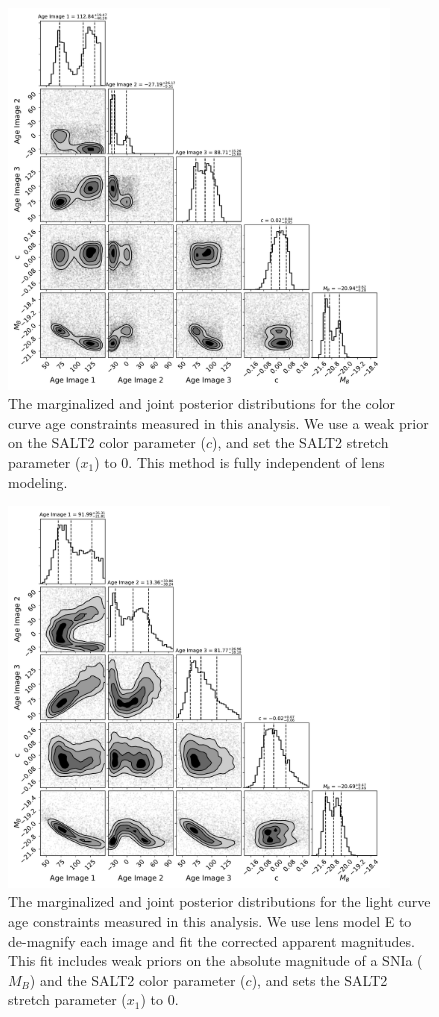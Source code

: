 \documentclass[12pt,dvipsnames]{article}
\begin{document}
\begin{figure}
    \centering
    \includegraphics[width=0.9\textwidth]{Paper/Figures/lc_modelH_color_corner.pdf}
    \caption{The marginalized and joint posterior distributions for the color curve age constraints measured in this analysis. We use a weak prior on the SALT2 color parameter ($c$), and set the SALT2 stretch parameter ($x_1$) to 0. This method is fully independent of lens modeling. }
    \label{fig:corner_cfit}
\end{figure}
\begin{figure}
    \centering
    \includegraphics[width=0.9\textwidth]{Paper/Figures/lc_modelH_corner.pdf}
    \caption{The marginalized and joint posterior distributions for the light curve age constraints measured in this analysis. We use lens model E to de-magnify each image and fit the corrected apparent magnitudes. This fit includes weak priors on the absolute magnitude of a SNIa ($M_B$) and the SALT2 color parameter ($c$), and sets the SALT2 stretch parameter ($x_1$) to 0.}
    \label{fig:corner_modelE}
\end{figure}
\end{document}
